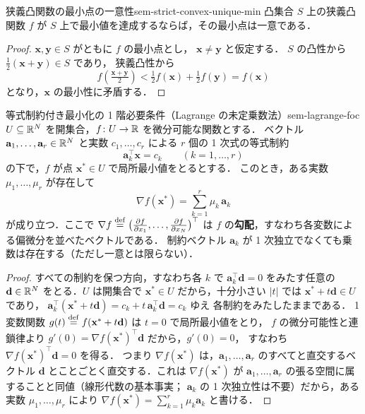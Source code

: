 \begin{proposition}{狭義凸関数の最小点の一意性}{sem-strict-convex-unique-min}
  凸集合 $S$ 上の狭義凸関数 $f$ が
  $S$ 上で最小値を達成するならば，その最小点は一意である．
\end{proposition}

\begin{proof}
  $\mathbf{x}, \mathbf{y} \in S$ がともに $f$ の最小点とし，
  $\mathbf{x} \neq \mathbf{y}$ と仮定する．
  $S$ の凸性から
  $\tfrac{1}{2}(\mathbf{x}+\mathbf{y}) \in S$ であり，
  狭義凸性から
  \[
    f\!\left(\tfrac{\mathbf{x}+\mathbf{y}}{2}\right)
    < \tfrac{1}{2}f(\mathbf{x}) + \tfrac{1}{2}f(\mathbf{y})
    = f(\mathbf{x})
  \]
  となり，$\mathbf{x}$ の最小性に矛盾する．
\end{proof}

\begin{theorem}{等式制約付き最小化の 1 階必要条件（Lagrange の未定乗数法）}{sem-lagrange-foc}
  $U \subseteq \mathbb{R}^N$ を開集合，$f \colon U \to \mathbb{R}$ を微分可能な関数とする．
  ベクトル $\mathbf{a}_1, \dots, \mathbf{a}_r \in \mathbb{R}^N$ と実数 $c_1, \dots, c_r$ による
  $r$ 個の 1 次式の等式制約
  \[
    \mathbf{a}_k^\top \mathbf{x} = c_k \qquad (k = 1, \dots, r)
  \]
  の下で，$f$ が点 $\mathbf{x}^* \in U$ で局所最小値をとるとする．
  このとき，ある実数 $\mu_1, \dots, \mu_r$ が存在して
  \[
    \nabla f(\mathbf{x}^*) = \sum_{k=1}^{r} \mu_k\, \mathbf{a}_k
  \]
  が成り立つ．ここで $\nabla f \overset{\mathrm{def}}{=} \bigl(\tfrac{\partial f}{\partial x_1}, \dots, \tfrac{\partial f}{\partial x_N}\bigr)^\top$
  は $f$ の\textbf{勾配}，すなわち各変数による偏微分を並べたベクトルである．
  制約ベクトル $\mathbf{a}_k$ が 1 次独立でなくても乗数は存在する（ただし一意とは限らない）．
\end{theorem}

\begin{proof}
  すべての制約を保つ方向，すなわち各 $k$ で $\mathbf{a}_k^\top \mathbf{d} = 0$ をみたす任意の
  $\mathbf{d} \in \mathbb{R}^N$ をとる．$U$ は開集合で $\mathbf{x}^* \in U$ だから，十分小さい $|t|$ では
  $\mathbf{x}^* + t\mathbf{d} \in U$ であり，
  $\mathbf{a}_k^\top(\mathbf{x}^* + t\mathbf{d}) = c_k + t\,\mathbf{a}_k^\top\mathbf{d} = c_k$ ゆえ
  各制約をみたしたままである．
  1 変数関数 $g(t) \overset{\mathrm{def}}{=} f(\mathbf{x}^* + t\mathbf{d})$ は $t = 0$ で局所最小値をとり，
  $f$ の微分可能性と連鎖律より $g'(0) = \nabla f(\mathbf{x}^*)^\top \mathbf{d}$ だから，$g'(0) = 0$，
  すなわち $\nabla f(\mathbf{x}^*)^\top \mathbf{d} = 0$ を得る．
  つまり $\nabla f(\mathbf{x}^*)$ は，$\mathbf{a}_1, \dots, \mathbf{a}_r$ のすべてと直交するベクトル
  $\mathbf{d}$ とことごとく直交する．これは $\nabla f(\mathbf{x}^*)$ が
  $\mathbf{a}_1, \dots, \mathbf{a}_r$ の張る空間に属することと同値（線形代数の基本事実；
  $\mathbf{a}_k$ の 1 次独立性は不要）だから，ある実数 $\mu_1, \dots, \mu_r$ により
  $\nabla f(\mathbf{x}^*) = \sum_{k=1}^{r} \mu_k \mathbf{a}_k$ と書ける．
\end{proof}

